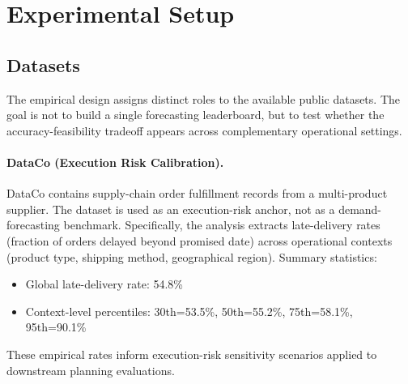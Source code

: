 \section{Experimental Setup}

\subsection{Datasets}

The empirical design assigns distinct roles to the available public datasets. The goal is not to build a single forecasting leaderboard, but to test whether the accuracy-feasibility tradeoff appears across complementary operational settings.

\paragraph{DataCo (Execution Risk Calibration).} DataCo contains supply-chain order fulfillment records from a multi-product supplier. The dataset is used as an execution-risk anchor, not as a demand-forecasting benchmark. Specifically, the analysis extracts late-delivery rates (fraction of orders delayed beyond promised date) across operational contexts (product type, shipping method, geographical region). Summary statistics:
\begin{itemize}
    \item Global late-delivery rate: 54.8\%
    \item Context-level percentiles: 30th=53.5\%, 50th=55.2\%, 75th=58.1\%, 95th=90.1\%
\end{itemize}
These empirical rates inform execution-risk sensitivity scenarios applied to downstream planning evaluations.


